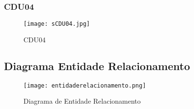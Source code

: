 \begin{landscape}
\subsubsection{CDU04}
\begin{figure}[htb]
	\centering
	\texttt{[image: sCDU04.jpg]}
	\caption{CDU04}
\end{figure}
\clearpage
%


\subsection{Diagrama Entidade Relacionamento}
\begin{figure}[htb]
	\centering
	\texttt{[image: entidaderelacionamento.png]}
	\caption{Diagrama de Entidade Relacionamento}
\end{figure}
\clearpage

\end{landscape}